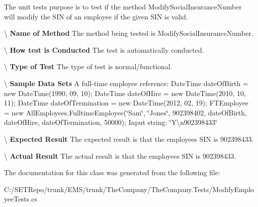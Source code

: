 The unit test\textquotesingle{}s purpose is to test if the method Modify\+Social\+Insurance\+Number will modify the S\+I\+N of an employee if the given S\+I\+N is valid. 

\textbackslash{} {\bfseries  Name of Method} The method being tested is Modify\+Social\+Insurance\+Number.

\textbackslash{} {\bfseries  How test is Conducted} The test is automatically conducted.

\textbackslash{} {\bfseries  Type of Test} The type of test is normal/functional.

\textbackslash{} {\bfseries  Sample Data Sets} A full-\/time employee reference\+: Date\+Time date\+Of\+Birth = new Date\+Time(1990, 09, 10); Date\+Time date\+Of\+Hire = new Date\+Time(2010, 10, 11); Date\+Time date\+Of\+Termination = new Date\+Time(2012, 02, 19); F\+T\+Employee = new All\+Employees.\+Fulltime\+Employee(\char`\"{}\+Sam\char`\"{}, \char`\"{}\+Jones\char`\"{}, 902398402, date\+Of\+Birth, date\+Of\+Hire, date\+Of\+Termination, 50000); Input string\+: \char`\"{}\+Y\textbackslash{}n902398433\char`\"{}

\textbackslash{} {\bfseries  Expected Result} The expected result is that the employee\textquotesingle{}s S\+I\+N is 902398433.

\textbackslash{} {\bfseries  Actual Result} The actual result is that the employee\textquotesingle{}s S\+I\+N is 902398433. 

The documentation for this class was generated from the following file\+:\begin{DoxyCompactItemize}
\item 
C\+:/\+S\+E\+T\+Repo/trunk/\+E\+M\+S/trunk/\+The\+Company/\+The\+Company.\+Tests/Modify\+Employee\+Tests.\+cs\end{DoxyCompactItemize}

